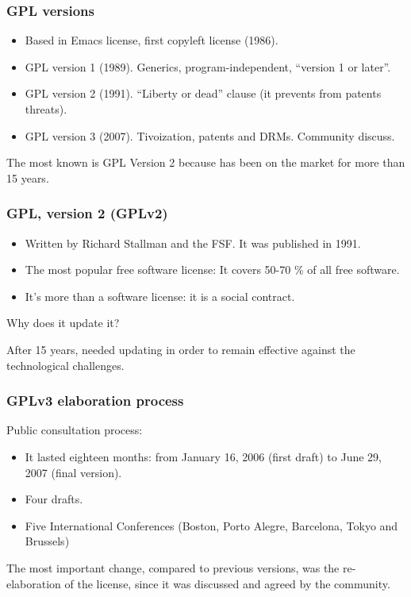 \documentclass{beamer}
\begin{document}
\begin{frame}
\frametitle{GPL versions}

\begin{itemize}
\item Based in Emacs license, first copyleft license (1986).
\item \alert{GPL version 1} (1989). Generics, program-independent, ``version 1 or later''.
\item \alert{GPL version 2} (1991). ``Liberty or dead'' clause (it prevents from patents threats).
\item \alert{GPL version 3} (2007). Tivoization, patents and DRMs. Community discuss.
\end{itemize}

\medskip

The most known is GPL Version 2 because has been on the market for more than 15 years. 

\end{frame}



\begin{frame}
\frametitle{GPL, version 2 (GPLv2)}

\begin{itemize}
    \item Written by Richard Stallman and the FSF. It was published in 1991.
    \item The most popular free software license: It covers 50-70 \% of all free software.
    \item It's more than a software license: it is a social contract.


\end{itemize}

\pause

{\centerline{\large \alert{Why does it update it?}}}

\pause

After 15 years, needed updating in order to remain effective against the technological challenges.
\end{frame}

\begin{frame}
\frametitle{GPLv3 elaboration process}

Public consultation process:
\begin{itemize}
\item It lasted eighteen months: from January 16, 2006 (first draft) to June 29, 2007 (final version).
\item Four drafts. 
\item Five International Conferences (Boston, Porto Alegre, Barcelona, Tokyo and Brussels)
\end{itemize}

\pause

The most important change, compared to previous versions, was the re-elaboration of the license, since it was discussed and agreed by the community.
\end{frame}
\end{document}
